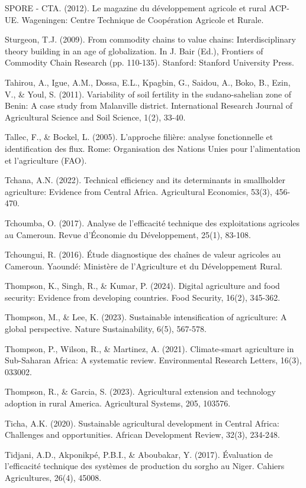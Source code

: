 \documentclass[12pt,oneside]{report}
\begin{document}
SPORE - CTA. (2012). Le magazine du développement agricole et rural ACP-UE. Wageningen: Centre Technique de Coopération Agricole et Rurale.

Sturgeon, T.J. (2009). From commodity chains to value chains: Interdisciplinary theory building in an age of globalization. In J. Bair (Ed.), Frontiers of Commodity Chain Research (pp. 110-135). Stanford: Stanford University Press.

Tahirou, A., Igue, A.M., Dossa, E.L., Kpagbin, G., Saidou, A., Boko, B., Ezin, V., \& Youl, S. (2011). Variability of soil fertility in the sudano-sahelian zone of Benin: A case study from Malanville district. International Research Journal of Agricultural Science and Soil Science, 1(2), 33-40.

Tallec, F., \& Bockel, L. (2005). L'approche filière: analyse fonctionnelle et identification des flux. Rome: Organisation des Nations Unies pour l'alimentation et l'agriculture (FAO).

Tchana, A.N. (2022). Technical efficiency and its determinants in smallholder agriculture: Evidence from Central Africa. Agricultural Economics, 53(3), 456-470.

Tchoumba, O. (2017). Analyse de l'efficacité technique des exploitations agricoles au Cameroun. Revue d'Économie du Développement, 25(1), 83-108.

Tchoungui, R. (2016). Étude diagnostique des chaînes de valeur agricoles au Cameroun. Yaoundé: Ministère de l'Agriculture et du Développement Rural.

Thompson, K., Singh, R., \& Kumar, P. (2024). Digital agriculture and food security: Evidence from developing countries. Food Security, 16(2), 345-362.

Thompson, M., \& Lee, K. (2023). Sustainable intensification of agriculture: A global perspective. Nature Sustainability, 6(5), 567-578.

Thompson, P., Wilson, R., \& Martinez, A. (2021). Climate-smart agriculture in Sub-Saharan Africa: A systematic review. Environmental Research Letters, 16(3), 033002.

Thompson, R., \& Garcia, S. (2023). Agricultural extension and technology adoption in rural America. Agricultural Systems, 205, 103576.

Ticha, A.K. (2020). Sustainable agricultural development in Central Africa: Challenges and opportunities. African Development Review, 32(3), 234-248.

Tidjani, A.D., Akponikpé, P.B.I., \& Aboubakar, Y. (2017). Évaluation de l'efficacité technique des systèmes de production du sorgho au Niger. Cahiers Agricultures, 26(4), 45008.
\end{document}
